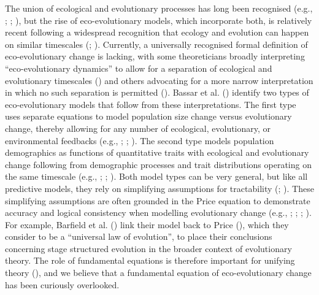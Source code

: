 \documentclass[
]{article}
\begin{document}
The union of ecological and evolutionary processes has long been
recognised (e.g., ;
;
), but the rise of
eco-evolutionary models, which incorporate both, is relatively recent
following a widespread recognition that ecology and evolution can happen
on similar timescales (;
). Currently, a
universally recognised formal definition of eco-evolutionary change is
lacking, with some theoreticians broadly interpreting ``eco-evolutionary
dynamics'' to allow for a separation of ecological and evolutionary
timescales () and others
advocating for a more narrow interpretation in which no such separation
is permitted (). Bassar et
al. () identify two types of
eco-evolutionary models that follow from these interpretations. The
first type uses separate equations to model population size change
versus evolutionary change, thereby allowing for any number of
ecological, evolutionary, or environmental feedbacks (e.g.,
; ; ). The second type
models population demographics as functions of quantitative traits with
ecological and evolutionary change following from demographic processes
and trait distributions operating on the same timescale (e.g.,
;
;
). Both model types can be
very general, but like all predictive models, they rely on simplifying
assumptions for tractability (;
). These simplifying assumptions are
often grounded in the Price equation to demonstrate accuracy and logical
consistency when modelling evolutionary change (e.g.,
;
;
;
). For example, Barfield et al.
() link their model back to Price
(), which they consider to be a
``universal law of evolution'', to place their conclusions concerning
stage structured evolution in the broader context of evolutionary
theory. The role of fundamental equations is therefore important for
unifying theory (),
and we believe that a fundamental equation of eco-evolutionary change
has been curiously overlooked.
\end{document}
